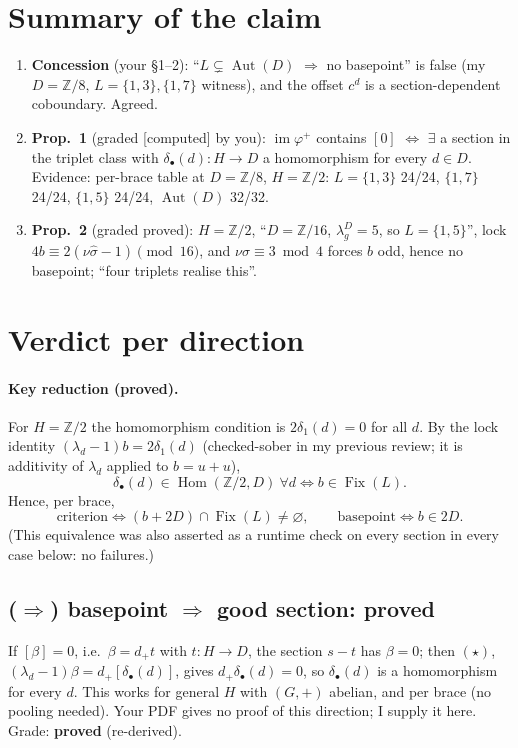 \documentclass[11pt]{article}
\newcommand{\Z}{\mathbb{Z}}
\newcommand{\Aut}{\operatorname{Aut}}
\newcommand{\Fix}{\operatorname{Fix}}
\newcommand{\Hom}{\operatorname{Hom}}
\newcommand{\im}{\operatorname{im}}
\newcommand{\sh}{\hat\sigma}
\newcommand{\dplus}{d_{+}}
\begin{document}
\section{Summary of the claim}
\begin{enumerate}[leftmargin=*]
\item \textbf{Concession} (your \S1--2): ``$L\subsetneq\Aut(D)$ $\Rightarrow$ no
basepoint'' is false (my $D=\Z/8$, $L=\{1,3\},\{1,7\}$ witness), and the offset $c^d$ is a
section-dependent coboundary. Agreed.
\item \textbf{Prop.~1} (graded [computed] by you): $\im\varphi^+$ contains $[0]$ $\iff$
$\exists$ a section in the triplet class with $\delta_\bullet(d):H\to D$ a homomorphism for
every $d\in D$. Evidence: per-brace table at $D=\Z/8$, $H=\Z/2$: $L=\{1,3\}$ 24/24,
$\{1,7\}$ 24/24, $\{1,5\}$ 24/24, $\Aut(D)$ 32/32.
\item \textbf{Prop.~2} (graded proved): $H=\Z/2$, ``$D=\Z/16$, $\lambda^D_g=5$, so
$L=\{1,5\}$'', lock $4b\equiv 2(\nu\sh-1)\pmod{16}$, and $\nu\sh\equiv3\bmod4$ forces $b$
odd, hence no basepoint; ``four triplets realise this''.
\end{enumerate}

\section{Verdict per direction}

\paragraph{Key reduction (proved).} For $H=\Z/2$ the homomorphism condition is
$2\delta_1(d)=0$ for all $d$. By the lock identity $(\lambda_d-1)b=2\delta_1(d)$ (checked-sober
in my previous review; it is additivity of $\lambda_d$ applied to $b=u+u$),
\[
\delta_\bullet(d)\in\Hom(\Z/2,D)\ \forall d\iff b\in\Fix(L).
\]
Hence, per brace,
\[
\text{criterion}\iff (b+2D)\cap\Fix(L)\neq\varnothing,\qquad \text{basepoint}\iff b\in 2D.
\]
(This equivalence was also asserted as a runtime check on every section in every case below:
no failures.)

\subsection*{($\Rightarrow$) basepoint $\Rightarrow$ good section: \textbf{proved}}
If $[\beta]=0$, i.e.\ $\beta=\dplus t$ with $t:H\to D$, the section $s-t$ has $\beta=0$; then
$(\star)$, $(\lambda_d-1)\beta=\dplus[\delta_\bullet(d)]$, gives $\dplus\delta_\bullet(d)=0$, so
$\delta_\bullet(d)$ is a homomorphism for every $d$. This works for general $H$ with $(G,+)$
abelian, and per brace (no pooling needed). Your PDF gives no proof of this direction; I
supply it here. Grade: \textbf{proved} (re-derived).
\end{document}
